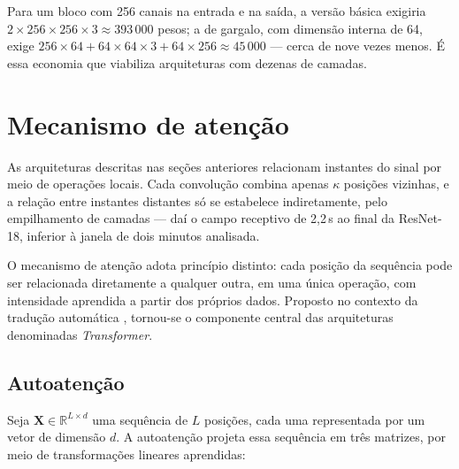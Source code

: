 Para um bloco com 256 canais na entrada e na saída, a versão básica exigiria
$2 \times 256 \times 256 \times 3 \approx 393\,000$ pesos; a de gargalo, com
dimensão interna de 64, exige $256 \times 64 + 64 \times 64 \times 3 + 64
	\times 256 \approx 45\,000$ --- cerca de nove vezes menos. É essa economia
que viabiliza arquiteturas com dezenas de camadas.

%
%

\section{Mecanismo de atenção}
\label{sec:fund-atencao}

As arquiteturas descritas nas seções anteriores relacionam instantes do
sinal por meio de operações locais. Cada convolução combina apenas $\kappa$
posições vizinhas, e a relação entre instantes distantes só se estabelece
indiretamente, pelo empilhamento de camadas --- daí o campo receptivo de
2,2\,s ao final da ResNet-18, inferior à janela de dois minutos analisada.

O mecanismo de atenção adota princípio distinto: cada posição da sequência
pode ser relacionada diretamente a qualquer outra, em uma única operação,
com intensidade aprendida a partir dos próprios dados. Proposto no contexto
da tradução automática \cite{vaswani2017attention}, tornou-se o componente
central das arquiteturas denominadas \textit{Transformer}.

\subsection{Autoatenção}
\label{subsec:fund-autoatencao}

Seja $\mathbf{X} \in \mathbb{R}^{L \times d}$ uma sequência de $L$ posições,
cada uma representada por um vetor de dimensão $d$. A autoatenção projeta
essa sequência em três matrizes, por meio de transformações lineares
aprendidas:

